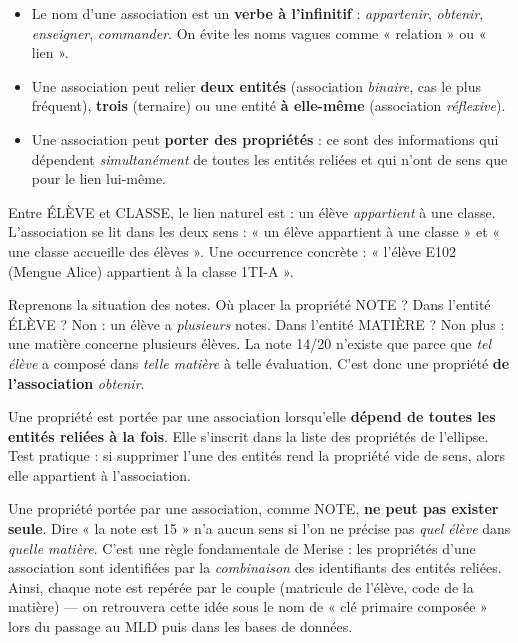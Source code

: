 \documentclass[11pt]{article}
\newcounter{popsec}
\newcounter{popsub}
\newcommand{\courssub}[1]{%
  \stepcounter{popsub}%
  \par\vspace{9pt}\noindent{\popxbold\fontsize{11.5}{13}\selectfont\color{popink}{\color{poporange}\thepopsec.\thepopsub}\hspace{6pt}#1}\par\nopagebreak\vspace{4pt}
}
\begin{document}
\begin{propriete}
\begin{itemize}
\item Le nom d'une association est un \textbf{verbe à l'infinitif} : \emph{appartenir}, \emph{obtenir}, \emph{enseigner}, \emph{commander}. On évite les noms vagues comme « relation » ou « lien ».
\item Une association peut relier \textbf{deux entités} (association \emph{binaire}, cas le plus fréquent), \textbf{trois} (ternaire) ou une entité \textbf{à elle-même} (association \emph{réflexive}).
\item Une association peut \textbf{porter des propriétés} : ce sont des informations qui dépendent \emph{simultanément} de toutes les entités reliées et qui n'ont de sens que pour le lien lui-même.
\end{itemize}
\end{propriete}

\begin{exemplebox}
Entre ÉLÈVE et CLASSE, le lien naturel est : un élève \emph{appartient} à une classe. L'association se lit dans les deux sens : « un élève appartient à une classe » et « une classe accueille des élèves ». Une occurrence concrète : « l'élève E102 (Mengue Alice) appartient à la classe 1TI-A ».
\end{exemplebox}

\courssub{Propriétés portées par une association}

Reprenons la situation des notes. Où placer la propriété NOTE ? Dans l'entité ÉLÈVE ? Non : un élève a \emph{plusieurs} notes. Dans l'entité MATIÈRE ? Non plus : une matière concerne plusieurs élèves. La note 14/20 n'existe que parce que \emph{tel élève} a composé dans \emph{telle matière} à telle évaluation. C'est donc une propriété \textbf{de l'association} \emph{obtenir}.

\begin{aretenir}
Une propriété est portée par une association lorsqu'elle \textbf{dépend de toutes les entités reliées à la fois}. Elle s'inscrit dans la liste des propriétés de l'ellipse. Test pratique : si supprimer l'une des entités rend la propriété vide de sens, alors elle appartient à l'association.
\end{aretenir}

\begin{savaistu}
Une propriété portée par une association, comme NOTE, \textbf{ne peut pas exister seule}. Dire « la note est 15 » n'a aucun sens si l'on ne précise pas \emph{quel élève} dans \emph{quelle matière}. C'est une règle fondamentale de Merise : les propriétés d'une association sont identifiées par la \emph{combinaison} des identifiants des entités reliées. Ainsi, chaque note est repérée par le couple (matricule de l'élève, code de la matière) — on retrouvera cette idée sous le nom de « clé primaire composée » lors du passage au MLD puis dans les bases de données.
\end{savaistu}
\end{document}
